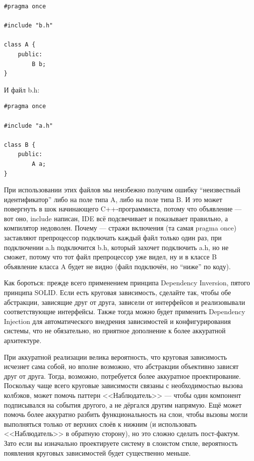 \documentclass{../text-style}
\begin{document}
\begin{verbatim}
#pragma once

#include "b.h"

class A {
    public:
        B b;
}
\end{verbatim}

И файл b.h:

\begin{verbatim}
#pragma once

#include "a.h"

class B {
    public:
        A a;
}
\end{verbatim}

При использовании этих файлов мы неизбежно получим ошибку ``неизвестный идентификатор'' либо на поле типа A, либо на поле типа B. И это может повергнуть в шок начинающего C++-программиста, потому что объявление --- вот оно, include написан, IDE всё подсвечивает и показывает правильно, а компилятор недоволен. Почему --- стражи включения (та самая pragma once) заставляют препроцессор подключать каждый файл только один раз, при подключении a.h подключится b.h, который захочет подключить a.h, но не сможет, потому что тот файл препроцессор уже видел, ну и в классе B объявление класса A будет не видно (файл подключён, но ``ниже'' по коду).

Как бороться: прежде всего применением принципа Dependency Inversion, пятого принципа SOLID. Если есть круговая зависимость, сделайте так, чтобы обе абстракции, зависящие друг от друга, зависели от интерфейсов и реализовывали соответствующие интерфейсы. Также тогда можно будет применить Dependency Injection для автоматического внедрения зависимостей и конфигурирования системы, что не обязательно, но приятное дополнение к более аккуратной архитектуре.

При аккуратной реализации велика вероятность, что круговая зависимость исчезнет сама собой, но вполне возможно, что абстракции объективно зависят друг от друга. Тогда, возможно, потребуется более аккуратное проектирование. Поскольку чаще всего круговые зависимости связаны с необходимостью вызова колбэков, может помочь паттерн <<Наблюдатель>> --- чтобы один компонент подписывался на события другого, а не дёргался другим напрямую. Ещё может помочь более аккуратно разбить функциональность на слои, чтобы вызовы могли выполняться только от верхних слоёв к нижним (и использовать <<Наблюдатель>> в обратную сторону), но это сложно сделать пост-фактум. Зато если вы изначально проектируете систему в слоистом стиле, вероятность появления круговых зависимостей будет существенно меньше.
\end{document}
